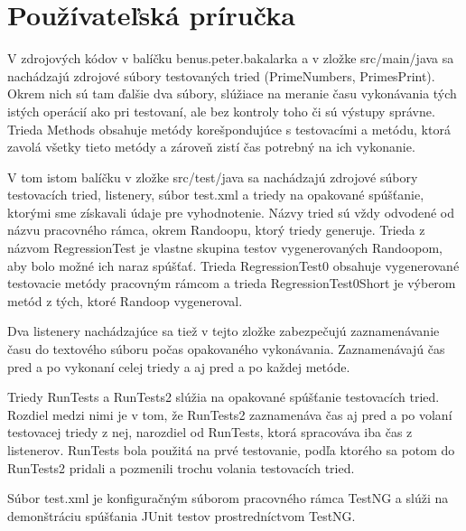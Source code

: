 \documentclass[11pt,twoside,slovak,a4paper]{article}
\begin{document}
 	\newpage
 	\section{Používateľská príručka}
 	
 	V zdrojových kódov v balíčku benus.peter.bakalarka a v zložke src/main/java sa nachádzajú zdrojové súbory testovaných tried (PrimeNumbers, PrimesPrint). Okrem nich sú tam ďalšie dva súbory, slúžiace na meranie času vykonávania tých istých operácií ako pri testovaní, ale bez kontroly toho či sú výstupy správne. Trieda Methods obsahuje metódy korešpondujúce s testovacími a metódu, ktorá zavolá všetky tieto metódy a zároveň zistí čas potrebný na ich vykonanie. 
 	
 	V tom istom balíčku v zložke src/test/java sa nachádzajú zdrojové súbory testovacích tried, listenery, súbor test.xml a triedy na opakované spúšťanie, ktorými sme získavali údaje pre vyhodnotenie. Názvy tried sú vždy odvodené od názvu pracovného rámca, okrem Randoopu, ktorý triedy generuje. Trieda z názvom RegressionTest je vlastne skupina testov vygenerovaných Randoopom, aby bolo možné ich naraz spúšťať. Trieda RegressionTest0 obsahuje vygenerované testovacie metódy pracovným rámcom a trieda RegressionTest0Short je výberom metód z tých, ktoré Randoop vygeneroval.
 	
 	Dva listenery nachádzajúce sa tiež v tejto zložke zabezpečujú zaznamenávanie času do textového súboru počas opakovaného vykonávania. Zaznamenávajú čas pred a po vykonaní celej triedy a aj pred a po každej metóde.
 	
 	Triedy RunTests a RunTests2 slúžia na opakované spúšťanie testovacích tried. Rozdiel medzi nimi je v tom, že RunTests2 zaznamenáva čas aj pred a po volaní testovacej triedy z nej, narozdiel od RunTests, ktorá spracováva iba čas z listenerov. RunTests bola použitá na prvé testovanie, podľa ktorého sa potom do RunTests2 pridali a pozmenili trochu volania testovacích tried.
 	
 	Súbor test.xml je konfiguračným súborom pracovného rámca TestNG a slúži na demonštráciu spúšťania JUnit testov prostredníctvom TestNG.	
\end{document}
